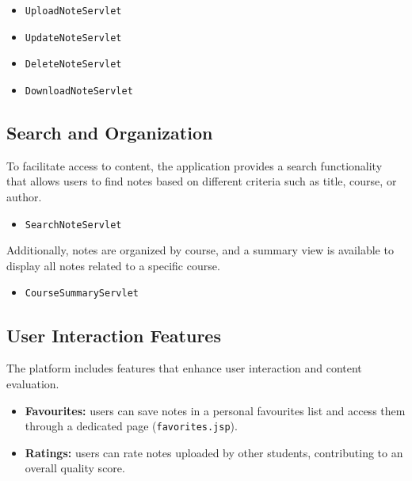 \documentclass[12pt, a4paper]{article}
\begin{document}
    \begin{itemize}
        \item \texttt{UploadNoteServlet}
        \item \texttt{UpdateNoteServlet}
        \item \texttt{DeleteNoteServlet}
        \item \texttt{DownloadNoteServlet}
    \end{itemize}

    \subsection{Search and Organization}

    To facilitate access to content, the application provides a search functionality
    that allows users to find notes based on different criteria such as title,
    course, or author.

    \begin{itemize}
        \item \texttt{SearchNoteServlet}
    \end{itemize}

    Additionally, notes are organized by course, and a summary view is available
    to display all notes related to a specific course.

    \begin{itemize}
        \item \texttt{CourseSummaryServlet}
    \end{itemize}

    \newpage
    \subsection{User Interaction Features}

    The platform includes features that enhance user interaction and content evaluation.

    \begin{itemize}
        \item \textbf{Favourites:} users can save notes in a personal favourites list
        and access them through a dedicated page (\texttt{favorites.jsp}).

        \item \textbf{Ratings:} users can rate notes uploaded by other students,
        contributing to an overall quality score.
    \end{itemize}
    \newpage
\end{document}
